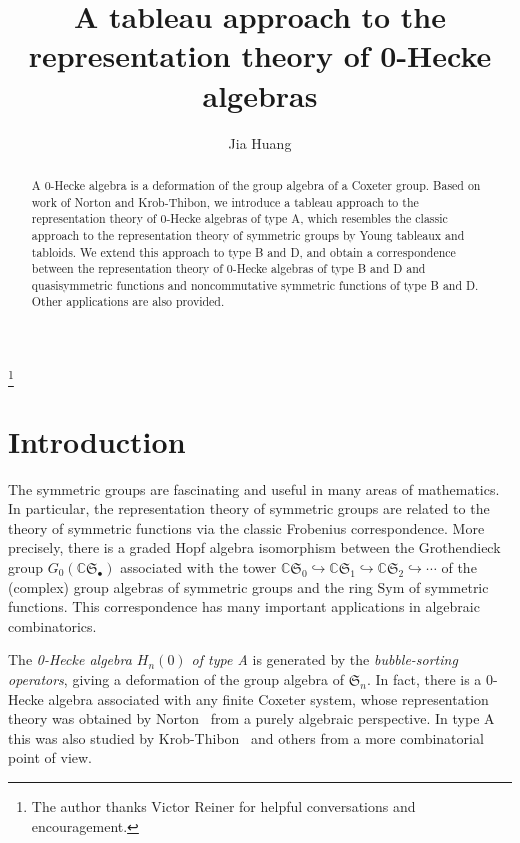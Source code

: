 \documentclass{amsart}
\newtheorem*{Young's Rule}{Young's Rule}
\theoremstyle{definition}
\theoremstyle{remark}
\numberwithin{equation}{section}
\begin{document}
\title{A tableau approach to the representation theory of 0-Hecke algebras}
\author{Jia Huang}
\address{Department of Mathematics and Statistics, University of Nebraska at Kearney, Kearney, NE 68849, USA}
\thanks{The author thanks Victor Reiner for helpful conversations and encouragement.}

\begin{abstract}
A 0-Hecke algebra is a deformation of the group algebra of a Coxeter group. Based on work of Norton and Krob-Thibon, we introduce a tableau approach to the representation theory of 0-Hecke algebras of type A, which resembles the classic approach to the representation theory of symmetric groups by Young tableaux and tabloids. We extend this approach to type B and D, and obtain a correspondence between the representation theory of 0-Hecke algebras of type B and D and quasisymmetric functions and noncommutative symmetric functions of type B and D. Other applications are also provided. 
\end{abstract}

\maketitle

\section{Introduction}

The symmetric groups are fascinating and useful in many areas of mathematics. In particular, the representation theory of symmetric groups are related to the theory of symmetric functions via the classic Frobenius correspondence. More precisely, there is a graded Hopf algebra isomorphism between the Grothendieck group $G_0({{\mathbb C}}{{\mathfrak S}}_\bullet)$ associated with the tower ${{\mathbb C}}{{\mathfrak S}}_0\hookrightarrow{{\mathbb C}}{{\mathfrak S}}_1\hookrightarrow{{\mathbb C}}{{\mathfrak S}}_2\hookrightarrow\cdots$ of the (complex) group algebras of symmetric groups and the ring ${\mathrm{Sym}}$ of symmetric functions. This correspondence has many important applications in algebraic combinatorics.

The \emph{0-Hecke algebra $H_n(0)$ of type A} is generated by the \emph{bubble-sorting operators}, giving a deformation of the group algebra of ${{\mathfrak S}}_n$. In fact, there is a 0-Hecke algebra associated with any finite Coxeter system, whose representation theory was obtained by Norton~\cite{Norton} from a purely algebraic perspective. In type A this was also studied by Krob-Thibon~\cite{KrobThibon} and others from a more combinatorial point of view.
\end{document}
